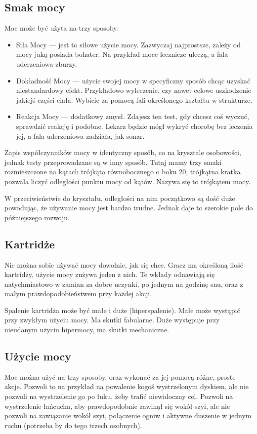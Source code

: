 \subsection{Smak mocy}
Moc może być użyta na trzy sposoby:
\begin{itemize}
 \item Siła Mocy \absm{} --- jest to siłowe użycie mocy. Zazwyczaj najprostsze, zależy od mocy jaką posiada bohater. Na przykład moce lecznicze uleczą, a fala uderzeniowa zburzy.
 \item Dokładność Mocy \abdm{} --- użycie swojej mocy w specyficzny sposób chcąc uzyskać niestandardowy efekt. Przykładowo wyleczenie, czy nawet celowe uszkodzenie jakiejś części ciała. Wybicie za pomocą fali określonego kształtu w strukturze.
 \item Reakcja Mocy \abrm{} --- dodatkowy zmysł. Zdajesz ten test, gdy chcesz coś wyczuć, sprawdzić reakcję i podobne. Lekarz będzie mógł wykryć chorobę bez leczenia jej, a fala uderzeniowa zadziała, jak sonar.
\end{itemize}

Zapis współczynników mocy w identyczny sposób, co na krysztale osobowości, jednak testy przeprowadzane są w inny sposób.
Tutaj mamy trzy smaki rozmieszczone na kątach trójkąta równobocznego o boku 20, trójkątna kratka pozwala liczyć odległości punktu mocy od kątów.
Nazywa się to trójkątem mocy.

W przeciwieństwie do kryształu, odległości na nim początkowo są dość duże powodując, że używanie mocy jest bardzo trudne.
Jednak daje to szerokie pole do późniejszego rozwoju.

\subsection{Kartridże}
Nie można sobie używać mocy dowolnie, jak się chce.
Gracz ma określoną ilość kartridży, użycie mocy zużywa jeden z nich.
Te wkłady odnawiają się natychmiastowo w zamian za dobre uczynki, po jednym na godzinę snu, oraz z małym prawdopodobieństwem przy każdej akcji.

Spalenie kartridża może być małe i duże (hiperspalenie).
Małe może wystąpić przy zwykłym użyciu mocy. Ma skutki fabularne.
Duże występuje przy nieudanym użyciu hipermocy, ma skutki mechaniczne.

\subsection{Użycie mocy}
Moc można użyć na trzy sposoby, oraz wykonać za jej pomocą różne, proste akcje.
Pozwoli to na przykład na powalenie kogoś wystrzelonym dyskiem, ale nie pozwoli na wystrzelenie go po łuku, żeby trafić niewidoczny cel.
Pozwoli na wystrzelenie łańcucha, aby prawdopodobnie zawinął się wokół szyi, ale nie pozwoli na zawiązanie wokół szyi, połączenie ogniw i aktywne duszenie w jednym ruchu (potrzeba by do tego trzech osobnych).

